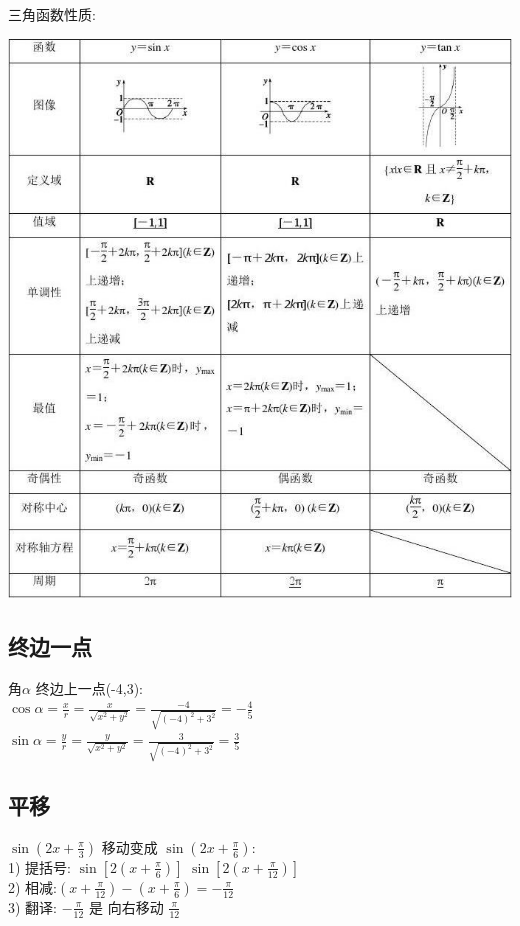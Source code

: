 \documentclass[hyperref, UTF8,11pt,a4paper]{ctexart} %
\begin{document}
三角函数性质: \\
\begin{center}
	\includegraphics[scale=0.7]  {pic/sanjiaohanshu/sanjiaohanshuxingzhi.jpg}

\end{center}
\newpage
\subsection{终边一点}
{\color{red} 角$\alpha$ 终边上一点(-4,3):} \\
$\cos \alpha=\frac{x}{r}=\frac{x}{\sqrt{x^{2}+y^{2}}}=\frac{-4}{\sqrt{(-4)^{2}+3^{2}}}=-\frac{4}{5}$ \\
$\sin \alpha=\frac{y}{r}=\frac{y}{\sqrt{x^{2}+y^{2}}}=\frac{3}{\sqrt{(-4)^{2}+3^{2}}}=\frac{3}{5}$


\subsection{平移}
{\color{red}  $\sin \left(2 x+\frac{\pi}{3}\right)$ 移动变成 $\sin \left(2 x+\frac{\pi}{6}\right)$:} \\
1) 提括号:	$\sin \left[2\left(x+\frac{\pi}{6}\right)\right]$ \quad $\sin \left[2\left(x+\frac{\pi}{12}\right)\right]$ \\
2) 相减:$\left(x+\frac{\pi}{12}\right)-\left(x+\frac{\pi}{6}\right)=-\frac{\pi}{12}$ \\
3) 翻译: $-\frac{\pi}{12}$ 是 向右移动 $\frac{\pi}{12}$
\end{document}
